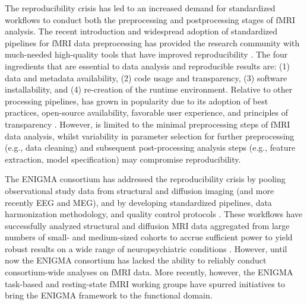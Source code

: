 The reproducibility crisis has led to an increased demand for standardized workflows to conduct both the preprocessing and postprocessing stages of fMRI analysis. The recent introduction and widespread adoption of standardized pipelines for fMRI data preprocessing has provided the research community with much-needed high-quality tools that have improved reproducibility \parencite{thompson2020b}. The four ingredients that are essential to data analysis and reproducible results are: (1) data and metadata availability, (2) code usage and transparency, (3) software installability, and (4) re-creation of the runtime environment. Relative to other processing pipelines,  \parencite{esteban2019a} has grown in popularity due to its adoption of best practices, open-source availability, favorable user experience, and  principles of transparency \parencite{poldrack2019}. However,  is limited to the minimal preprocessing steps of fMRI data analysis, whilst variability in parameter selection for further preprocessing (e.g., data cleaning) and subsequent post-processing analysis steps (e.g., feature extraction, model specification) may compromise reproducibility.

The ENIGMA consortium has addressed the reproducibility crisis by pooling observational study data from structural and diffusion imaging (and more recently EEG and MEG), and by developing standardized pipelines, data harmonization methodology, and quality control protocols \parencite{thompson2020a}. These workflows have successfully analyzed structural and diffusion MRI data aggregated from large numbers of small- and medium-sized cohorts to accrue sufficient power to yield robust results on a wide range of neuropsychiatric conditions \parencite[e.g.][]{schmaal2020,vandenheuvel2020,hoogman2020}. However, until now the ENIGMA consortium has lacked the ability to reliably conduct consortium-wide analyses on fMRI data. More recently, however, the ENIGMA task-based \parencite{veer2019b} and resting-state fMRI \parencite{adhikari2019} working groups have spurred initiatives to bring the ENIGMA framework to the functional domain.

